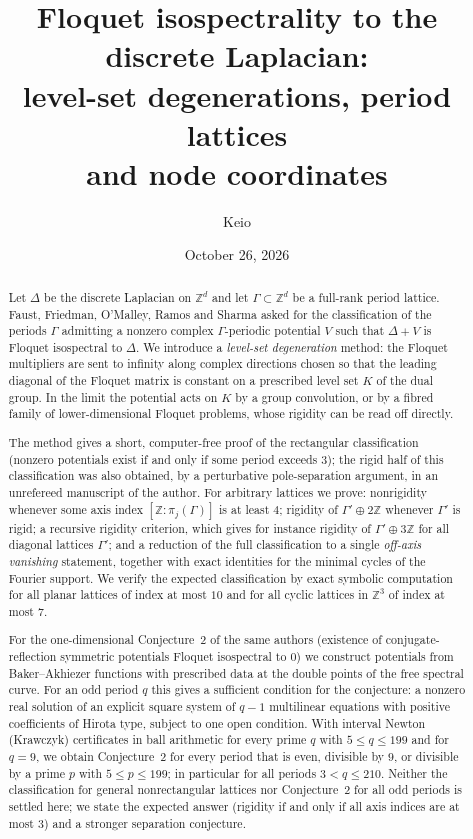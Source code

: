 \documentclass[11pt,reqno]{amsart}
\title[Level-set degenerations and node coordinates]{Floquet isospectrality to the discrete Laplacian:\\
level-set degenerations, period lattices\\ and node coordinates}
\author{Keio}
\date{October 26, 2026}
\theoremstyle{definition}
\theoremstyle{remark}
\newcommand{\Z}{\mathbb Z}
\begin{document}
\begin{abstract}
Let $\Delta$ be the discrete Laplacian on $\Z^d$ and let $\Gamma\subset\Z^d$
be a full-rank period lattice.  Faust, Friedman, O'Malley, Ramos and Sharma
asked for the classification of the periods $\Gamma$ admitting a nonzero
complex $\Gamma$-periodic potential $V$ such that $\Delta+V$ is Floquet
isospectral to $\Delta$.  We introduce a \emph{level-set degeneration}
method: the Floquet multipliers are sent to infinity along complex directions
chosen so that the leading diagonal of the Floquet matrix is constant on a
prescribed level set $K$ of the dual group.  In the limit the potential acts
on $K$ by a group convolution, or by a fibred family of lower-dimensional
Floquet problems, whose rigidity can be read off directly.

The method gives a short, computer-free proof of the rectangular
classification (nonzero potentials exist if and only if some period exceeds
$3$); the rigid half of this classification was also obtained, by a
perturbative pole-separation argument, in an unrefereed manuscript of the
author.  For arbitrary lattices we prove: nonrigidity whenever some axis index
$[\Z:\pi_j(\Gamma)]$ is at least $4$; rigidity of $\Gamma'\oplus2\Z$ whenever
$\Gamma'$ is rigid; a recursive rigidity criterion, which gives for instance
rigidity of $\Gamma'\oplus3\Z$ for all diagonal lattices $\Gamma'$; and a
reduction of the full classification to a single \emph{off-axis vanishing}
statement, together with exact identities for the minimal cycles of the
Fourier support.  We verify the expected classification by exact symbolic
computation for all planar lattices of index at most $10$ and for all cyclic
lattices in $\Z^3$ of index at most $7$.

For the one-dimensional Conjecture~2 of the same authors (existence of
conjugate-reflection symmetric potentials Floquet isospectral to $0$) we
construct potentials from Baker--Akhiezer functions with prescribed data at
the double points of the free spectral curve.  For an odd period $q$ this
gives a sufficient condition for the conjecture: a nonzero real solution of
an explicit square system of $q-1$ multilinear equations with positive
coefficients of Hirota type, subject to one open condition.  With interval
Newton (Krawczyk) certificates in ball arithmetic for every prime $q$ with
$5\le q\le 199$ and for $q=9$, we obtain Conjecture~2 for every period
that is even, divisible by $9$, or divisible by a prime $p$ with $5\le p\le 199$;
in particular for all periods $3<q\le 210$.  Neither the classification for general
nonrectangular lattices nor Conjecture~2 for all odd periods is settled here;
we state the expected answer (rigidity if and only if all axis indices are at
most $3$) and a stronger separation conjecture.
\end{abstract}
\end{document}
